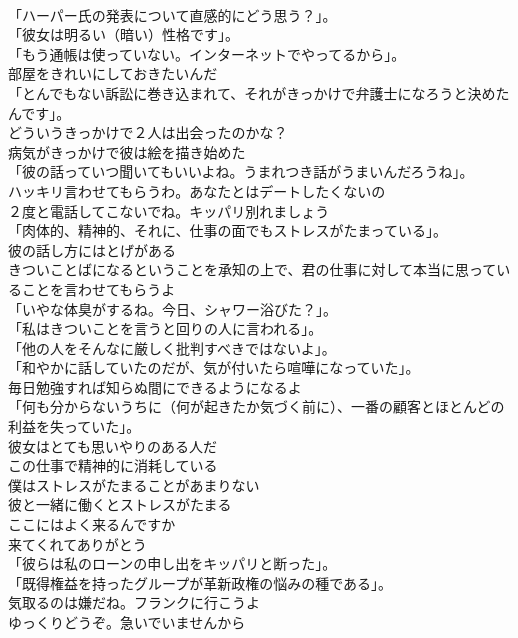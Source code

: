 \documentclass[8pt]{extreport}
\begin{document}
\begin{CJK}{UTF8}{min}
\\	「ハーパー氏の発表について直感的にどう思う？」。	
\\	「彼女は明るい（暗い）性格です」。	
\\	「もう通帳は使っていない。インターネットでやってるから」。	
\\	部屋をきれいにしておきたいんだ	
\\	「とんでもない訴訟に巻き込まれて、それがきっかけで弁護士になろうと決めたんです」。	
\\	どういうきっかけで２人は出会ったのかな？	
\\	病気がきっかけで彼は絵を描き始めた	
\\	「彼の話っていつ聞いてもいいよね。うまれつき話がうまいんだろうね」。	
\\	ハッキリ言わせてもらうわ。あなたとはデートしたくないの	
\\	２度と電話してこないでね。キッパリ別れましょう	
\\	「肉体的、精神的、それに、仕事の面でもストレスがたまっている」。	
\\	彼の話し方にはとげがある	
\\	きついことばになるということを承知の上で、君の仕事に対して本当に思っていることを言わせてもらうよ	
\\	「いやな体臭がするね。今日、シャワー浴びた？」。	
\\	「私はきついことを言うと回りの人に言われる」。	
\\	「他の人をそんなに厳しく批判すべきではないよ」。	
\\	「和やかに話していたのだが、気が付いたら喧嘩になっていた」。	
\\	毎日勉強すれば知らぬ間にできるようになるよ	
\\	「何も分からないうちに（何が起きたか気づく前に）、一番の顧客とほとんどの利益を失っていた」。	
\\	彼女はとても思いやりのある人だ	
\\	この仕事で精神的に消耗している	
\\	僕はストレスがたまることがあまりない	
\\	彼と一緒に働くとストレスがたまる	
\\	ここにはよく来るんですか	
\\	来てくれてありがとう	
\\	「彼らは私のローンの申し出をキッパリと断った」。	
\\	「既得権益を持ったグループが革新政権の悩みの種である」。	
\\	気取るのは嫌だね。フランクに行こうよ	
\\	ゆっくりどうぞ。急いでいませんから	

\end{CJK}
\end{document}
